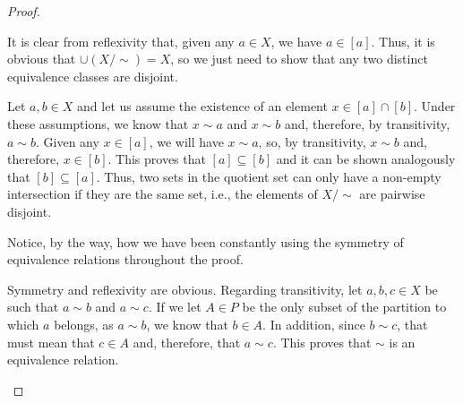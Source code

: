 \begin{proof}
\begin{parlist}
\item It is clear from reflexivity that, given any $a\in X$, we have $a\in [a]$.
Thus, it is obvious that $\cup (X/{\sim}) = X$, so we just need to show that any two distinct equivalence classes are disjoint.

Let $a,b\in X$ and let us assume the existence of an element $x\in [a]\cap [b]$.
Under these assumptions, we know that $x\sim a$ and $x\sim b$ and, therefore, by transitivity, $a\sim b$. Given any $x\in [a]$, we will have $x\sim a$, so, by transitivity, $x\sim b$ and, therefore, $x\in [b]$.
This proves that $[a]\subseteq [b]$ and it can be shown analogously that $[b] \subseteq [a]$.
Thus, two sets in the quotient set can only have a non-empty intersection if they are the same set, i.e., the elements of $X/{\sim}$ are pairwise disjoint. 

Notice, by the way, how we have been constantly using the symmetry of equivalence relations throughout the proof.

\item Symmetry and reflexivity are obvious. Regarding transitivity, let $a,b, c\in X$ be such that $a\sim b$ and $a\sim c$. If we let $A\in P$ be the only subset of the partition to which $a$ belongs, as $a\sim b$, we know that $b\in A$. In addition, since $b\sim c$, that must mean that $c\in A$ and, therefore, that $a\sim c$. This proves that $\sim$ is an equivalence relation.
\end{parlist}
\end{proof}

